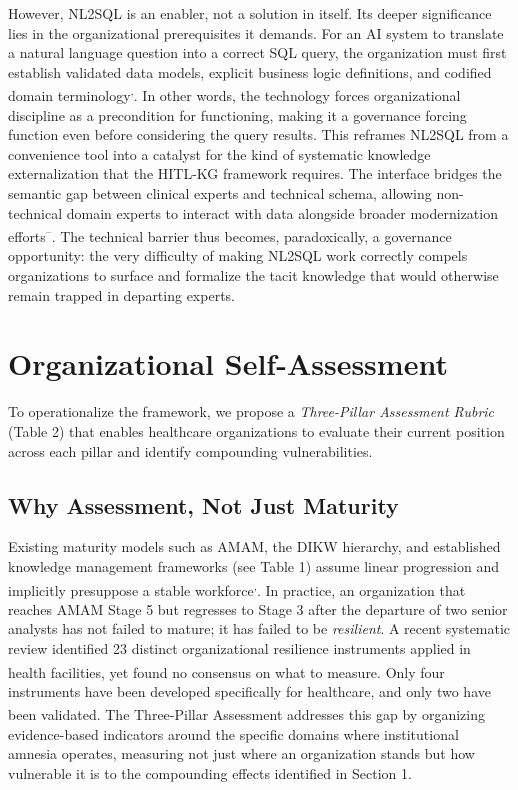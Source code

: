 \documentclass[
  american,
  11pt,
  letterpaper,
  oneside  ,captions=tableheading
]{scrartcl}
\begin{document}
However, NL2SQL is an enabler, not a solution in itself. Its deeper
significance lies in the organizational prerequisites it demands. For an
AI system to translate a natural language question into a correct SQL
query, the organization must first establish validated data models,
explicit business logic definitions, and codified domain
terminology\textsuperscript{,}.
In other words, the technology forces organizational discipline as a
precondition for functioning, making it a governance forcing function
even before considering the query results. This reframes NL2SQL from a
convenience tool into a catalyst for the kind of systematic knowledge
externalization that the HITL-KG framework requires. The interface
bridges the semantic gap between clinical experts and technical schema,
allowing non-technical domain experts to interact with data alongside
broader modernization
efforts\textsuperscript{--}.
The technical barrier thus becomes, paradoxically, a governance
opportunity: the very difficulty of making NL2SQL work correctly compels
organizations to surface and formalize the tacit knowledge that would
otherwise remain trapped in departing experts.

\section{Organizational
Self-Assessment}\label{organizational-self-assessment}

To operationalize the framework, we propose a \emph{Three-Pillar
Assessment Rubric} (Table 2) that enables healthcare organizations to
evaluate their current position across each pillar and identify
compounding vulnerabilities.

\subsection{Why Assessment, Not Just
Maturity}\label{why-assessment-not-just-maturity}

Existing maturity models such as AMAM, the DIKW hierarchy, and
established knowledge management frameworks (see Table 1) assume linear
progression and implicitly presuppose a stable
workforce\textsuperscript{,}.
In practice, an organization that reaches AMAM Stage 5 but regresses to
Stage 3 after the departure of two senior analysts has not failed to
mature; it has failed to be \emph{resilient}. A recent systematic review
identified 23 distinct organizational resilience instruments applied in
health facilities, yet found no consensus on what to
measure\textsuperscript{}. Only four
instruments have been developed specifically for healthcare, and only
two have been validated\textsuperscript{}.
The Three-Pillar Assessment addresses this gap by organizing
evidence-based indicators around the specific domains where
institutional amnesia operates, measuring not just where an organization
stands but how vulnerable it is to the compounding effects identified in
Section 1.
\end{document}
